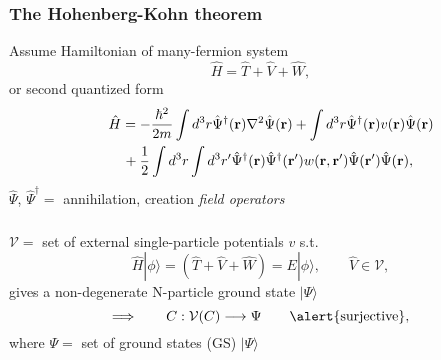 \documentclass[compress]{beamer}
\newcommand*{\ket}[1]{|#1\rangle}
\begin{document}
\frame
{
  \frametitle{The Hohenberg-Kohn theorem}
{\scriptsize
Assume \alert{Hamiltonian} of many-fermion system
\[
\hat{H} = \hat{T}+\hat{V}+\hat{W},
\]
or second quantized form
\begin{eqnarray}
\lefteqn{ \hat{H} = -\frac{\hbar^{2}}{2m}\int d^{3}r\hat{\Psi}^{\dagger}(\mathbf{r})\nabla^{2}\hat{\Psi}(\mathbf{r})+\int d^{3}r\hat{\Psi}^{\dagger}(\mathbf{r})v(\mathbf{r})\hat{\Psi}(\mathbf{r}) } \nonumber\\
& & {}+\frac{1}{2}\int d^{3}r\int d^{3}r'\hat{\Psi}^{\dagger}(\mathbf{r})\hat{\Psi}^{\dagger}(\mathbf{r'}) w(\mathbf{r},\mathbf{r'})\hat{\Psi}(\mathbf{r'})\hat{\Psi}(\mathbf{r}),\nonumber
\end{eqnarray}
$\hat{\Psi}$, $\hat{\Psi}^{\dagger } =$ annihilation, creation \emph{field operators}
}
}

\frame
{
  \frametitle{}
\begin{small}
{\scriptsize

$\mathcal{V} =$ set of external single-particle \alert{potentials} $v$ s.t. 
\begin{equation}
\hat{H}\ket{\phi} = \left(\hat{T}+\hat{V}+\hat{W}\right)=E\ket{\phi},\qquad \hat{V}\in \mathcal{V},\nonumber
\end{equation} 
gives a \alert{non-degenerate} N-particle ground state $\ket{\Psi }$
\begin{equation}
  \Longrightarrow \qquad C:\mathcal{V}(C)\longrightarrow \Psi \qquad \text{\alert{surjective},}  \nonumber 
\end{equation}
where $\Psi = $ set of ground states (GS) $\ket{\Psi }$
}
\end{small}
}
\end{document}
